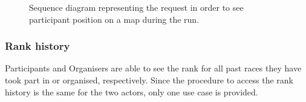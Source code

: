             \begin{figure}[H]
                \centering
                \caption{Sequence diagram representing the request in order to see participant position on a map during the run.}
                \label{fig:T4R-runner-tracking}
            \end{figure}
            
        \subsubsection{Rank history}
            Participants and Organisers are able to see the rank for all past races they have took part in or organised, respectively. Since the procedure to access the rank history is the same for the two actors, only one use case is provided.

